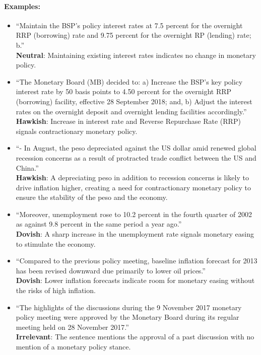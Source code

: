 \paragraph{Examples: }
\begin{itemize}
    \item ``Maintain the BSP’s policy interest rates at 7.5 percent for the overnight RRP (borrowing) rate and 9.75 percent for the overnight RP (lending) rate; b.''\\
    \textbf{Neutral}: Maintaining existing interest rates indicates no change in monetary policy.
    
    \item ``The Monetary Board (MB) decided to: a) Increase the BSP’s key policy interest rate by 50 basis points to 4.50 percent for the overnight RRP (borrowing) facility, effective 28 September 2018; and, b) Adjust the interest rates on the overnight deposit and overnight lending facilities accordingly.''\\
    \textbf{Hawkish}: Increase in interest rate and Reverse Repurchase Rate (RRP) signals contractionary monetary policy. 

    \item ``- In August, the peso depreciated against the US dollar amid renewed global recession concerns as a result of protracted trade conflict between the US and China.''\\
    \textbf{Hawkish}: A depreciating peso in addition to recession concerns is likely to drive inflation higher, creating a need for contractionary monetary policy to ensure the stability of the peso and the economy.
    
    \item ``Moreover, unemployment rose to 10.2 percent in the fourth quarter of 2002 as against 9.8 percent in the same period a year ago.''\\
    \textbf{Dovish}: A sharp increase in the unemployment rate signals monetary easing to stimulate the economy. 

    \item ``Compared to the previous policy meeting, baseline inflation forecast for 2013 has been revised downward due primarily to lower oil prices.''\\
    \textbf{Dovish}: Lower inflation forecasts indicate room for monetary easing without the risks of high inflation.

    \item ``The highlights of the discussions during the 9 November 2017 monetary policy meeting were approved by the Monetary Board during its regular meeting held on 28 November 2017.''\\
    \textbf{Irrelevant}: The sentence mentions the approval of a past discussion with no mention of a monetary policy stance.
\end{itemize}

